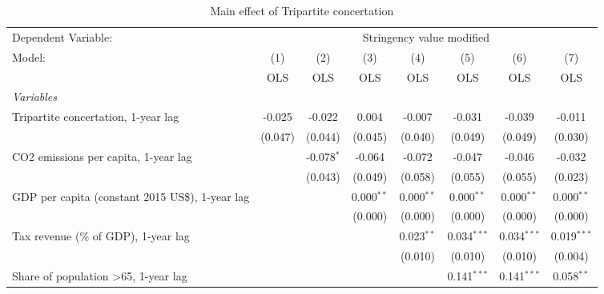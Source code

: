 
\begin{table}[htbp]
   \caption{Main effect of Tripartite concertation}
   \centering
   \begin{tabular}{lccccccc}
      \toprule
      Dependent Variable: & \multicolumn{7}{c}{Stringency value modified}\\
      Model:                                                & (1)     & (2)          & (3)          & (4)          & (5)           & (6)           & (7)\\  
                                                            &  OLS    & OLS          & OLS          & OLS          & OLS           & OLS           & OLS\\  
      \midrule
      \emph{Variables}\\
      Tripartite concertation, 1-year lag                   & -0.025  & -0.022       & 0.004        & -0.007       & -0.031        & -0.039        & -0.011\\   
                                                            & (0.047) & (0.044)      & (0.045)      & (0.040)      & (0.049)       & (0.049)       & (0.030)\\   
      CO2 emissions per capita, 1-year lag                  &         & -0.078$^{*}$ & -0.064       & -0.072       & -0.047        & -0.046        & -0.032\\   
                                                            &         & (0.043)      & (0.049)      & (0.058)      & (0.055)       & (0.055)       & (0.023)\\   
      GDP per capita (constant 2015 US\$), 1-year lag       &         &              & 0.000$^{**}$ & 0.000$^{**}$ & 0.000$^{**}$  & 0.000$^{**}$  & 0.000$^{**}$\\   
                                                            &         &              & (0.000)      & (0.000)      & (0.000)       & (0.000)       & (0.000)\\   
      Tax revenue (\% of GDP), 1-year lag                   &         &              &              & 0.023$^{**}$ & 0.034$^{***}$ & 0.034$^{***}$ & 0.019$^{***}$\\   
                                                            &         &              &              & (0.010)      & (0.010)       & (0.010)       & (0.004)\\   
      Share of population >65, 1-year lag                   &         &              &              &              & 0.141$^{***}$ & 0.141$^{***}$ & 0.058$^{**}$\\   

\end{tabular}
\end{table}

